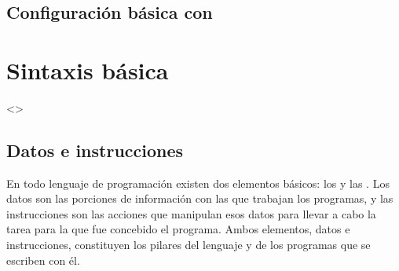\documentclass[a4paper,12pt,spanish]{sphinxmanual}
\begin{document}
\subsection{Configuración básica con }
\label{\detokenize{php:configuracion-basica-con-php-ini}}

\subsubsection{}
\label{\detokenize{php:error-reporting-e-all}}

\subsubsection{}
\label{\detokenize{php:display-errors-on}}

\subsubsection{}
\label{\detokenize{php:display-startup-errors-on}}

\subsubsection{}
\label{\detokenize{php:date-timezone-utc}}

\section{Sintaxis básica}
\label{\detokenize{php:sintaxis-basica}}
\textless{}\textgreater{}

\ignorespaces 

\subsection{Datos e instrucciones}
\label{\detokenize{php:datos-e-instrucciones}}\label{\detokenize{php:index-0}}
En todo lenguaje de programación existen dos elementos básicos: los  y
las . Los datos son las porciones de información con las que
trabajan los programas, y las instrucciones son las acciones que manipulan esos
datos para llevar a cabo la tarea para la que fue concebido el programa. Ambos
elementos, datos e instrucciones, constituyen los pilares del lenguaje y de los
programas que se escriben con él.
\end{document}
